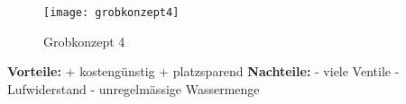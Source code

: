 \newpage
\begin{wrapfigure}{r}{0.5\textwidth}
  \begin{center}
    \texttt{[image: grobkonzept4]}
  \end{center}
  \caption{Grobkonzept 4}
\end{wrapfigure}


\textbf{Vorteile:}							\newline
+	kostengünstig							\newline
+ 	platzsparend								\newline
\newline
\textbf{Nachteile:}\newline
-	viele Ventile								\newline
-	Lufwiderstand							\newline
-	unregelmässige Wassermenge				\newline
\WFclear			
\newpage